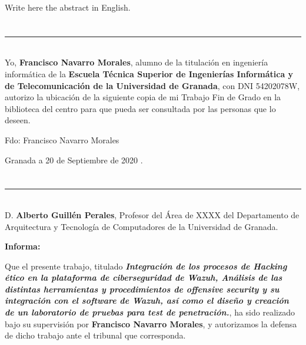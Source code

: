 Write here the abstract in English.

\chapter*{}
\thispagestyle{empty}

\noindent\rule[-1ex]{\textwidth}{2pt}\\[4.5ex]

Yo, \textbf{Francisco Navarro Morales}, alumno de la titulación en ingeniería informática de la \textbf{Escuela Técnica Superior
de Ingenierías Informática y de Telecomunicación de la Universidad de Granada}, con DNI 54202078W, autorizo la
ubicación de la siguiente copia de mi Trabajo Fin de Grado en la biblioteca del centro para que pueda ser
consultada por las personas que lo deseen.

\vspace{6cm}

\noindent Fdo: Francisco Navarro Morales

\vspace{2cm}

\begin{flushright}
Granada a 20 de Septiembre de 2020 .
\end{flushright}


\chapter*{}
\thispagestyle{empty}

\noindent\rule[-1ex]{\textwidth}{2pt}\\[4.5ex]

D. \textbf{Alberto Guillén Perales}, Profesor del Área de XXXX del Departamento de Arquitectura y Tecnología de Computadores de la Universidad de Granada.


\vspace{0.5cm}

\textbf{Informa:}

\vspace{0.5cm}

Que el presente trabajo, titulado \textit{\textbf{Integración de los procesos de Hacking ético en la plataforma de ciberseguridad de Wazuh, Análisis de las distintas herramientas y procedimientos de offensive security y su integración con el software de Wazuh, así como el diseño y creación de un laboratorio de pruebas para test de penetración.}},
ha sido realizado bajo su supervisión por \textbf{Francisco Navarro Morales}, y autorizamos la defensa de dicho trabajo ante el tribunal
que corresponda.

